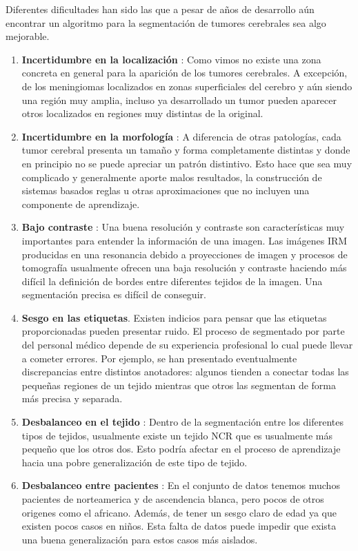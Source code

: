 Diferentes dificultades han sido las que a pesar de años de desarrollo aún encontrar un algoritmo para la segmentación de tumores cerebrales sea algo mejorable. 

\begin{enumerate}
	\item \textbf{Incertidumbre en la localización} : Como vimos no existe una zona concreta en general para la aparición de los tumores cerebrales. A excepción, de los meningiomas localizados en zonas superficiales del cerebro y aún siendo una región muy amplia, incluso ya desarrollado un tumor pueden aparecer otros localizados en regiones muy distintas de la original. 
	\item \textbf{Incertidumbre en la morfología} : A diferencia de otras patologías, cada tumor cerebral presenta un tamaño y forma completamente distintas y donde en principio no se puede apreciar un patrón distintivo. Esto hace que sea muy complicado y generalmente aporte malos resultados, la construcción de sistemas basados reglas u otras aproximaciones que no incluyen una componente de aprendizaje.
	
	\item \textbf{Bajo contraste} : Una buena resolución y contraste son características muy importantes para entender la información de una imagen. Las imágenes IRM producidas en una resonancia debido a proyecciones de imagen y procesos de tomografía usualmente ofrecen una baja resolución y contraste haciendo más difícil la definición de bordes entre diferentes tejidos de la imagen. Una segmentación precisa es difícil de conseguir.
	
	\item \textbf{Sesgo en las etiquetas}. Existen indicios para pensar que las etiquetas proporcionadas pueden presentar ruido. El proceso de segmentado por parte del personal médico 
	depende de su experiencia profesional lo cual puede llevar a cometer errores. Por ejemplo, se han presentado eventualmente discrepancias entre distintos anotadores: algunos tienden a conectar todas las pequeñas regiones de un tejido mientras que otros las segmentan de forma más precisa y separada. 
	
	\item \textbf{Desbalanceo en el tejido} : Dentro de la segmentación entre los diferentes tipos de tejidos, usualmente existe un tejido NCR que es usualmente más pequeño que los otros dos. 
	Esto podría afectar en el proceso de aprendizaje hacia una pobre generalización de este tipo de tejido. 
	
	\item \textbf{Desbalanceo entre pacientes} : En el conjunto de datos tenemos muchos pacientes de norteamerica y de ascendencia blanca, pero pocos de otros origenes como el africano. Además, de tener un sesgo claro de edad ya que existen pocos casos en niños. Esta falta de datos puede impedir que exista una buena generalización para estos casos más aislados.
	
\end{enumerate}


